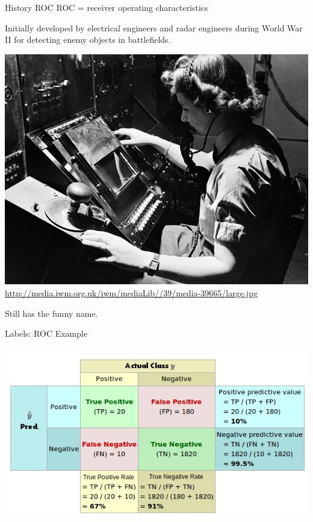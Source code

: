 \documentclass[11pt,compress,t,notes=noshow, xcolor=table]{beamer}
\begin{document}
\begin{frame}{History ROC}
ROC = receiver operating characteristics

\lz

Initially developed by electrical engineers and radar engineers during World War II for detecting enemy objects in battlefields.

\begin{center}
\includegraphics[width=.4\textwidth]{figure_man/receiver_operator.jpg}
{\tiny \url{http://media.iwm.org.uk/iwm/mediaLib//39/media-39665/large.jpg}}
\end{center}

Still has the funny name.
\end{frame}


\begin{vbframe}{Labels: ROC}
Example
\begin{center}
  \includegraphics[width=\textwidth]{figure_man/roc-confmatrix-example.png}
\end{center}

\end{vbframe}
\end{document}
